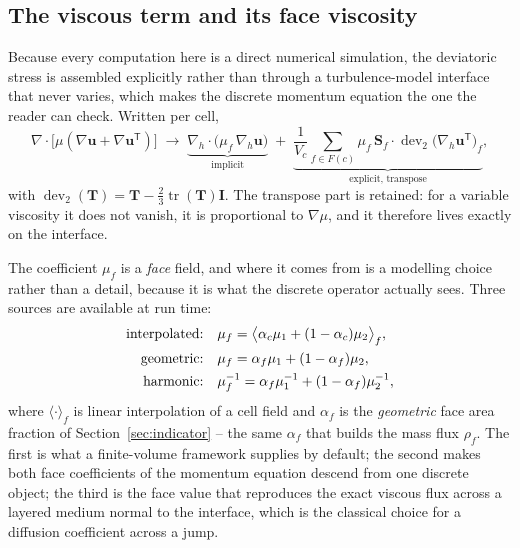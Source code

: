 \documentclass[preprint,3p,11pt]{elsarticle}
\newcommand{\uvec}{\mathbf{u}}
\begin{document}
\subsection{The viscous term and its face viscosity}
\label{sec:viscous}
Because every computation here is a direct numerical simulation, the deviatoric stress is
assembled explicitly rather than through a turbulence-model interface that never varies,
which makes the discrete momentum equation the one the reader can check. Written per cell,
\begin{equation}
  \nabla\!\cdot\!\bigl[\mu(\nabla\uvec+\nabla\uvec^{\mathsf T})\bigr]
  \;\longrightarrow\;
  \underbrace{\nabla_h\!\cdot\!\bigl(\mu_f\,\nabla_h\uvec\bigr)}_{\text{implicit}}
  \;+\;
  \underbrace{\frac{1}{V_c}\sum_{f\in F(c)}
     \mu_f\,\mathbf S_f\!\cdot\!\operatorname{dev}_2\!\bigl(\nabla_h\uvec^{\mathsf T}\bigr)_f}
     _{\text{explicit, transpose}} ,
  \label{eq:viscous}
\end{equation}
with $\operatorname{dev}_2(\mathbf T)=\mathbf T-\tfrac23\operatorname{tr}(\mathbf T)\mathbf I$.
The transpose part is retained: for a variable viscosity it does not vanish, it is
proportional to $\nabla\mu$, and it therefore lives exactly on the interface.

The coefficient $\mu_f$ is a \emph{face} field, and where it comes from is a modelling
choice rather than a detail, because it is what the discrete operator actually sees. Three
sources are available at run time:
\begin{align}
  \text{interpolated:} \quad & \mu_f = \bigl\langle \alpha_c\mu_1+(1-\alpha_c)\mu_2 \bigr\rangle_f , \notag\\
  \text{geometric:}    \quad & \mu_f = \alpha_f\mu_1+(1-\alpha_f)\mu_2 , \label{eq:muf}\\
  \text{harmonic:}     \quad & \mu_f^{-1} = \alpha_f\mu_1^{-1}+(1-\alpha_f)\mu_2^{-1} , \notag
\end{align}
where $\langle\cdot\rangle_f$ is linear interpolation of a cell field and $\alpha_f$ is the
\emph{geometric} face area fraction of Section~\ref{sec:indicator} -- the same $\alpha_f$
that builds the mass flux $\rho_f$. The first is what a finite-volume framework supplies by
default; the second makes both face coefficients of the momentum equation descend from one
discrete object; the third is the face value that reproduces the exact viscous flux across
a layered medium normal to the interface, which is the classical choice for a diffusion
coefficient across a jump.
\end{document}

